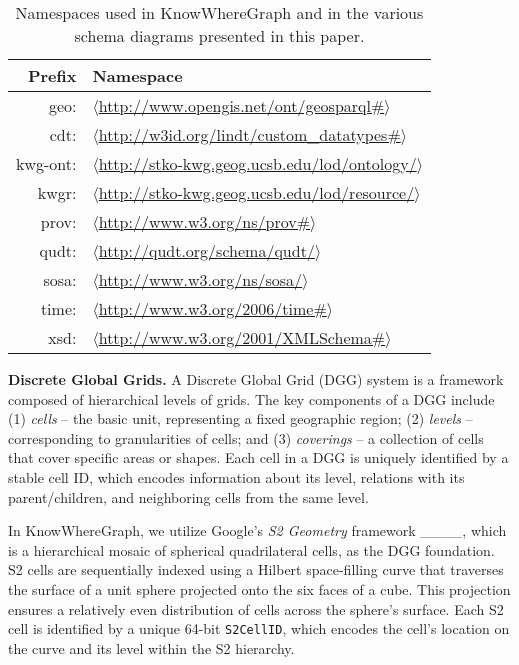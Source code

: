 \begin{table}
    \centering
    \begin{tabular}{r|l}
Prefix   & Namespace \\\hline
geo:     & $\langle$\url{http://www.opengis.net/ont/geosparql#}$\rangle$\\
cdt:    & $\langle$\url{http://w3id.org/lindt/custom_datatypes#}$\rangle$\\
kwg-ont: & $\langle$\url{http://stko-kwg.geog.ucsb.edu/lod/ontology/}$\rangle$\\
kwgr:    & $\langle$\url{http://stko-kwg.geog.ucsb.edu/lod/resource/}$\rangle$\\
prov:    & $\langle$\url{http://www.w3.org/ns/prov#}$\rangle$\\
qudt:    & $\langle$\url{http://qudt.org/schema/qudt/}$\rangle$\\
sosa:    & $\langle$\url{http://www.w3.org/ns/sosa/}$\rangle$\\
time:    & $\langle$\url{http://www.w3.org/2006/time#}$\rangle$\\
xsd:     & $\langle$\url{http://www.w3.org/2001/XMLSchema#}$\rangle$
    \end{tabular}
    \caption{Namespaces used in KnowWhereGraph and in the various schema diagrams presented in this paper.} 
    \label{tab:namespaces}
\end{table}



\textbf{Discrete Global Grids. } A Discrete Global Grid (DGG) system is a framework composed of hierarchical levels of grids. The key components of a DGG include (1) \emph{cells} -- the basic unit, representing a fixed geographic region; (2) \emph{levels} -- corresponding to granularities of cells; and (3) \emph{coverings} -- a collection of cells that cover specific areas or shapes. Each cell in a DGG is uniquely identified by a stable cell ID, which encodes information about its level, relations with its parent/children, and neighboring cells from the same level. 

In KnowWhereGraph, we utilize Google's \emph{S2 Geometry} framework ____, which is a hierarchical mosaic of spherical quadrilateral cells, as the DGG foundation. S2 cells are sequentially indexed using a Hilbert space-filling curve that traverses the surface of a unit sphere projected onto the six faces of a cube. This projection ensures a relatively even distribution of cells across the sphere's surface. Each S2 cell is identified by a unique 64-bit \texttt{S2CellID}, which encodes the cell’s location on the curve and its level within the S2 hierarchy. 

